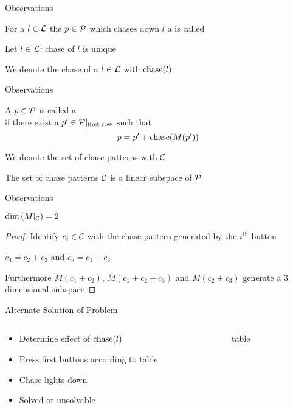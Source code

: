 \begin{frame}{Observations}
	\begin{definition}
		For a $l \in \mathcal{L}$ the $p \in \mathcal{P}$ which chases down $l$ a
		is called 
	\end{definition}
	
	\bigskip
	
	\begin{theorem}
		Let $l \in \mathcal{L}$: chase of $l$ is unique
	\end{theorem}
	
	\bigskip
	
	We denote the chase of a $l \in \mathcal{L}$ with $\operatorname{chase}(l)$
\end{frame}

\begin{frame}{Observations}
	\begin{definition}
		A $p \in \mathcal{P}$ is called a \structure{chase pattern}\\
		if there exist a $p' \in \mathcal{P}|_{\text{first row}}$ such that
		\[
			p = p' + \operatorname{chase}(M(p'))
		\]
	\end{definition}
	
	\bigskip
	
	We denote the set of chase patterns with $\mathcal{C}$
	
	\bigskip
	
	\begin{theorem}
		The set of chase patterns $\mathcal{C}$ is a linear subspace of $\mathcal{P}$
	\end{theorem}
\end{frame}

\begin{frame}{Observations}
	\begin{theorem}
		$\dim\left(M|_{\mathcal{C}}\right) = 2$
	\end{theorem}
	\begin{proof}
		Identify $c_{i} \in \mathcal{C}$ with the chase pattern generated by
		the $i^{\text{th}}$ button
		
		$c_{4} = c_{2} + c_{3}$ and $c_{5} = c_{1} + c_{3}$
		
		Furthermore $M(c_{1} + c_{2})$, $M(c_{1} + c_{2} + c_{3})$ and
		$M(c_{2} + c_{3})$ generate a 3 dimensional subspace
	\end{proof}
\end{frame}

\begin{frame}{Alternate Solution of Problem}
	\begin{columns}
		\begin{column}{0.45\textwidth}
			\begin{itemize}
				\item Determine effect of $\operatorname{chase}(l)$
				\item Press first buttons according to table
				\item Chase lights down
				\item Solved or unsolvable
			\end{itemize}
		\end{column}
		\begin{column}{0.45\textwidth}
			table
		\end{column}
	\end{columns}
\end{frame}

